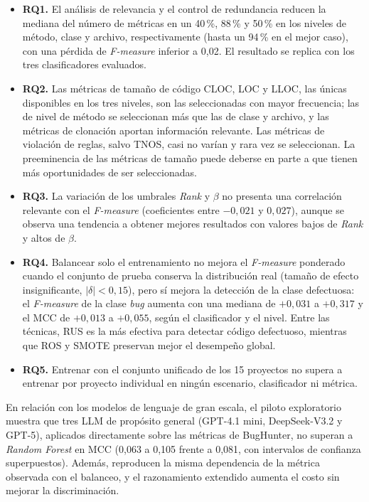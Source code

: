 \begin{itemize}
    \item \textbf{RQ1.} El análisis de relevancia y el control de redundancia reducen la mediana del número de métricas en un 40\,\%, 88\,\% y 50\,\% en los niveles de método, clase y archivo, respectivamente (hasta un 94\,\% en el mejor caso), con una pérdida de \textit{F-measure} inferior a 0,02. El resultado se replica con los tres clasificadores evaluados.
    \item \textbf{RQ2.} Las métricas de tamaño de código CLOC, LOC y LLOC, las únicas disponibles en los tres niveles, son las seleccionadas con mayor frecuencia; las de nivel de método se seleccionan más que las de clase y archivo, y las métricas de clonación aportan información relevante. Las métricas de violación de reglas, salvo TNOS, casi no varían y rara vez se seleccionan. La preeminencia de las métricas de tamaño puede deberse en parte a que tienen más oportunidades de ser seleccionadas.
    \item \textbf{RQ3.} La variación de los umbrales \textit{Rank} y $\beta$ no presenta una correlación relevante con el \textit{F-measure} (coeficientes entre $-0{,}021$ y $0{,}027$), aunque se observa una tendencia a obtener mejores resultados con valores bajos de \textit{Rank} y altos de $\beta$.
    \item \textbf{RQ4.} Balancear solo el entrenamiento no mejora el \textit{F-measure} ponderado cuando el conjunto de prueba conserva la distribución real (tamaño de efecto insignificante, $|\delta| < 0{,}15$), pero sí mejora la detección de la clase defectuosa: el \textit{F-measure} de la clase \textit{bug} aumenta con una mediana de $+0{,}031$ a $+0{,}317$ y el MCC de $+0{,}013$ a $+0{,}055$, según el clasificador y el nivel. Entre las técnicas, RUS es la más efectiva para detectar código defectuoso, mientras que ROS y SMOTE preservan mejor el desempeño global.
    \item \textbf{RQ5.} Entrenar con el conjunto unificado de los 15 proyectos no supera a entrenar por proyecto individual en ningún escenario, clasificador ni métrica.
\end{itemize}

En relación con los modelos de lenguaje de gran escala, el piloto exploratorio muestra que tres LLM de propósito general (GPT-4.1 mini, DeepSeek-V3.2 y GPT-5), aplicados directamente sobre las métricas de BugHunter, no superan a \textit{Random Forest} en MCC (0,063 a 0,105 frente a 0,081, con intervalos de confianza superpuestos). Además, reproducen la misma dependencia de la métrica observada con el balanceo, y el razonamiento extendido aumenta el costo sin mejorar la discriminación.

